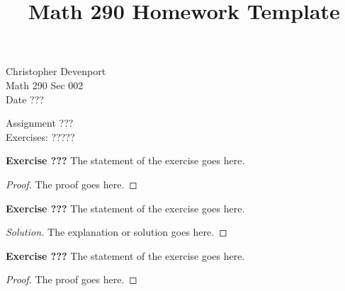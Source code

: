 \documentclass[12pt,oneside]{article}
\title{Math 290 Homework Template}
\newenvironment{exercise}[1]{\vspace{.1in}\noindent\textbf{Exercise #1 \hspace{.05em}}}{}
\begin{document}
\begin{flushright}
\sc Christopher Devenport  \\
Math 290 Sec 002\\
Date ???
\end{flushright}
\bigskip


\begin{center}
\textsf{Assignment ???} \\
\textsf{Exercises: ?????}
\end{center}


\begin{exercise}{???}
The statement of the exercise goes here.
\end{exercise}

\begin{proof}
The proof goes here.
\end{proof}



\begin{exercise}{???}
The statement of the exercise goes here.
\end{exercise}

\begin{proof}[Solution]
The explanation or solution goes here.
\end{proof}



\begin{exercise}{???}
The statement of the exercise goes here.
\end{exercise}

\begin{proof}
The proof goes here.
\end{proof}


\end{document}
